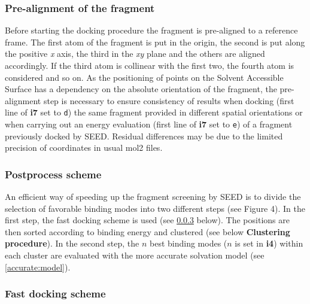 \documentclass[a4paper,12pt,titlepage]{article}
\begin{document}
\subsubsection{Pre-alignment of the fragment} %
Before starting the docking procedure the fragment 
is pre-aligned to a reference frame. The first atom of the fragment is put in the origin, the second is put along the positive \textit{x} axis, the third in the \textit{xy} plane and the others are aligned accordingly. If the third atom is collinear with the first two, the fourth atom is considered and so on. As the positioning of points on the Solvent Accessible Surface has a dependency on the absolute orientation of the fragment, the pre-alignment step is necessary to ensure consistency of results when docking (first line of \textbf{i7} set to \texttt{d}) the same fragment provided in different spatial orientations or when carrying out an energy evaluation (first line of \textbf{i7} set to \texttt{e}) of a fragment previously docked by SEED. Residual differences may be due to the limited precision of coordinates in usual mol2 files.

\subsubsection{Postprocess scheme}
\label{sssec:Post}

An efficient way of speeding up the fragment screening by SEED is to divide the selection of favorable 
binding modes into two different steps (see Figure 4). In the first step, the fast docking scheme 
is used (see \ref{sssec:fastdock} below). The positions are then sorted according to binding energy 
and clustered (see below {\bf Clustering procedure}). 
In the second step, the $n$ best binding modes ($n$ is set in {\bf i4}) within each cluster are 
evaluated with the more accurate solvation model (see \ref{accurate:model}).

\subsubsection{Fast docking scheme}
\label{sssec:fastdock}
\end{document}
